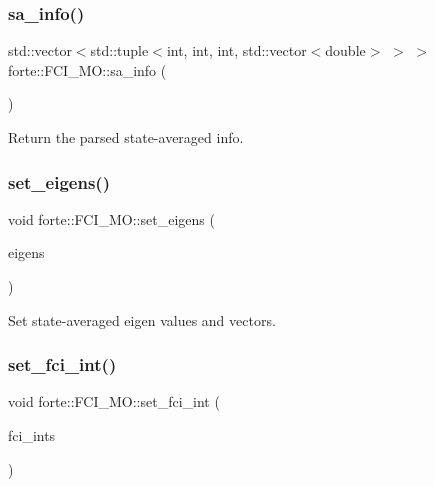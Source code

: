 \subsubsection{\texorpdfstring{sa\+\_\+info()}{sa\_info()}}
{\footnotesize\ttfamily std\+::vector$<$std\+::tuple$<$int, int, int, std\+::vector$<$double$>$ $>$ $>$ forte\+::\+F\+C\+I\+\_\+\+M\+O\+::sa\+\_\+info (\begin{DoxyParamCaption}{ }\end{DoxyParamCaption})\hspace{0.3cm}{\ttfamily [inline]}}



Return the parsed state-\/averaged info. 

\mbox{\label{classforte_1_1_f_c_i___m_o_af339a885a59587db951603dcf93509f0}} 
\subsubsection{\texorpdfstring{set\+\_\+eigens()}{set\_eigens()}}
{\footnotesize\ttfamily void forte\+::\+F\+C\+I\+\_\+\+M\+O\+::set\+\_\+eigens (\begin{DoxyParamCaption}\item[{const std\+::vector$<$ std\+::vector$<$ std\+::pair$<$ psi\+::\+Shared\+Vector, double $>$$>$$>$ \&}]{eigens }\end{DoxyParamCaption})}



Set state-\/averaged eigen values and vectors. 

\mbox{\label{classforte_1_1_f_c_i___m_o_a2005b802582673e81dc86e9dd0d33039}} 
\subsubsection{\texorpdfstring{set\+\_\+fci\+\_\+int()}{set\_fci\_int()}}
{\footnotesize\ttfamily void forte\+::\+F\+C\+I\+\_\+\+M\+O\+::set\+\_\+fci\+\_\+int (\begin{DoxyParamCaption}\item[{std\+::shared\+\_\+ptr$<$ \mbox{\hyperlink{classforte_1_1_active_space_integrals}{Active\+Space\+Integrals}} $>$}]{fci\+\_\+ints }\end{DoxyParamCaption})\hspace{0.3cm}{\ttfamily [inline]}}



